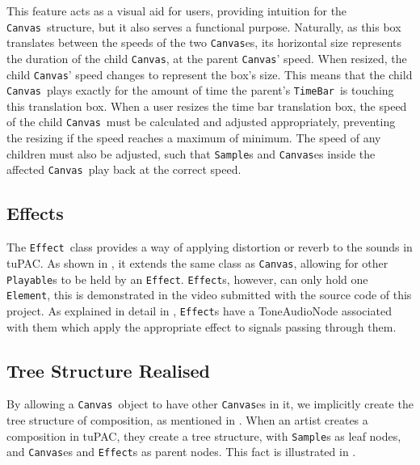 \documentclass[12pt,a4paper,oneside,openright]{report}
\newcommand{\element}{\texttt{Element}}
\newcommand{\canvas}{\texttt{Canvas}}
\newcommand{\timebar}{\texttt{TimeBar}}
\newcommand{\playable}{\texttt{Playable}}
\newcommand{\sample}{\texttt{Sample}}
\newcommand{\effect}{\texttt{Effect}}
\begin{document}
This feature acts as a visual aid for users, providing intuition for the \canvas\ structure, but it also serves a functional purpose. Naturally, as this box translates between the speeds of the two \canvas es, its horizontal size represents the duration of the child \canvas, at the parent \canvas' speed. When resized, the child \canvas' speed changes to represent the box's size. This means that the child \canvas\ plays exactly for the amount of time the parent's \timebar\ is touching this translation box. When a user resizes the time bar translation box, the speed of the child \canvas\ must be calculated and adjusted appropriately, preventing the resizing if the speed reaches a maximum of minimum. The speed of any children must also be adjusted, such that \sample s and \canvas es inside the affected \canvas\ play back at the correct speed. 

\subsection{Effects}
The \effect\ class provides a way of applying distortion or reverb to the sounds in tuPAC. As shown in , it extends the same class as \canvas, allowing for other \playable s to be held by an \effect. \effect s, however, can only hold one \element, this is demonstrated in the video submitted with the source code of this project. As explained in detail in , \effect s have a ToneAudioNode associated with them which apply the appropriate effect to signals passing through them.

\subsection{Tree Structure Realised}
By allowing a \canvas\ object to have other \canvas es in it, we implicitly create the tree structure of composition, as mentioned in . When an artist creates a composition in tuPAC, they create a tree structure, with \sample s as leaf nodes, and \canvas es and \effect s as parent nodes. This fact is illustrated in .
\end{document}
